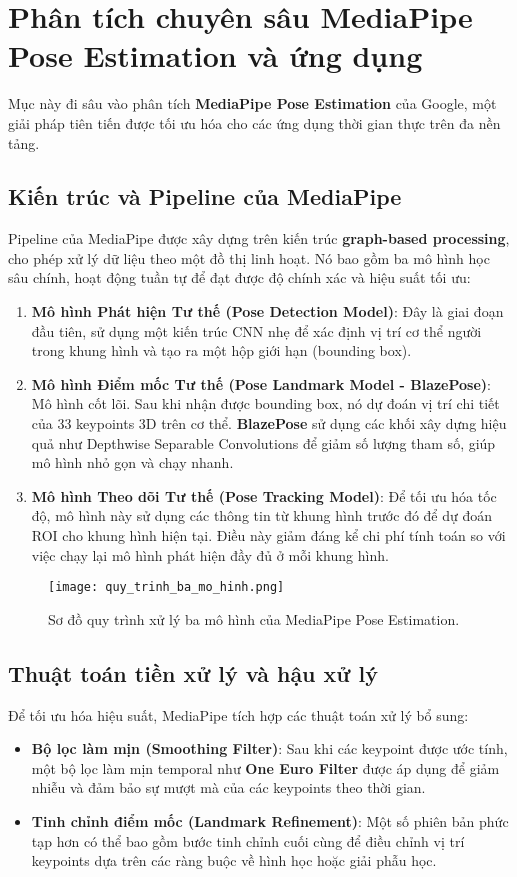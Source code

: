 \section{Phân tích chuyên sâu MediaPipe Pose Estimation và ứng dụng}

Mục này đi sâu vào phân tích \textbf{MediaPipe Pose Estimation} của Google, một giải pháp tiên tiến được tối ưu hóa cho các ứng dụng thời gian thực trên đa nền tảng.

\subsection{Kiến trúc và Pipeline của MediaPipe}
Pipeline của MediaPipe được xây dựng trên kiến trúc \textbf{graph-based processing}, cho phép xử lý dữ liệu theo một đồ thị linh hoạt. Nó bao gồm ba mô hình học sâu chính, hoạt động tuần tự để đạt được độ chính xác và hiệu suất tối ưu:
\begin{enumerate}
    \item \textbf{Mô hình Phát hiện Tư thế (Pose Detection Model)}: Đây là giai đoạn đầu tiên, sử dụng một kiến trúc CNN nhẹ để xác định vị trí cơ thể người trong khung hình và tạo ra một hộp giới hạn (bounding box).
    \item \textbf{Mô hình Điểm mốc Tư thế (Pose Landmark Model - BlazePose)}: Mô hình cốt lõi. Sau khi nhận được bounding box, nó dự đoán vị trí chi tiết của 33 keypoints 3D trên cơ thể. \textbf{BlazePose} sử dụng các khối xây dựng hiệu quả như Depthwise Separable Convolutions để giảm số lượng tham số, giúp mô hình nhỏ gọn và chạy nhanh.
    \item \textbf{Mô hình Theo dõi Tư thế (Pose Tracking Model)}: Để tối ưu hóa tốc độ, mô hình này sử dụng các thông tin từ khung hình trước đó để dự đoán ROI cho khung hình hiện tại. Điều này giảm đáng kể chi phí tính toán so với việc chạy lại mô hình phát hiện đầy đủ ở mỗi khung hình.
\end{enumerate}
\begin{figure}[h]
    \centering
    \texttt{[image: quy\_trinh\_ba\_mo\_hinh.png]}
    \caption{Sơ đồ quy trình xử lý ba mô hình của MediaPipe Pose Estimation.}
    \label{fig:mediapipe_pipeline}
\end{figure}

\subsection{Thuật toán tiền xử lý và hậu xử lý}
Để tối ưu hóa hiệu suất, MediaPipe tích hợp các thuật toán xử lý bổ sung:
\begin{itemize}
    \item \textbf{Bộ lọc làm mịn (Smoothing Filter)}: Sau khi các keypoint được ước tính, một bộ lọc làm mịn temporal như \textbf{One Euro Filter} được áp dụng để giảm nhiễu và đảm bảo sự mượt mà của các keypoints theo thời gian.
    \item \textbf{Tinh chỉnh điểm mốc (Landmark Refinement)}: Một số phiên bản phức tạp hơn có thể bao gồm bước tinh chỉnh cuối cùng để điều chỉnh vị trí keypoints dựa trên các ràng buộc về hình học hoặc giải phẫu học.
\end{itemize}


